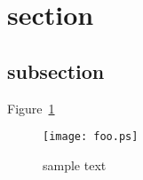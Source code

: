 \documentclass{article}
\begin{document}
\section{section}
\subsection{subsection}

Figure~\ref{fig:foo}
\begin{figure}[!ht]
\texttt{[image: foo.ps]}
\caption{sample text}
\label{fig:foo}
\end{figure}
\end{document}
